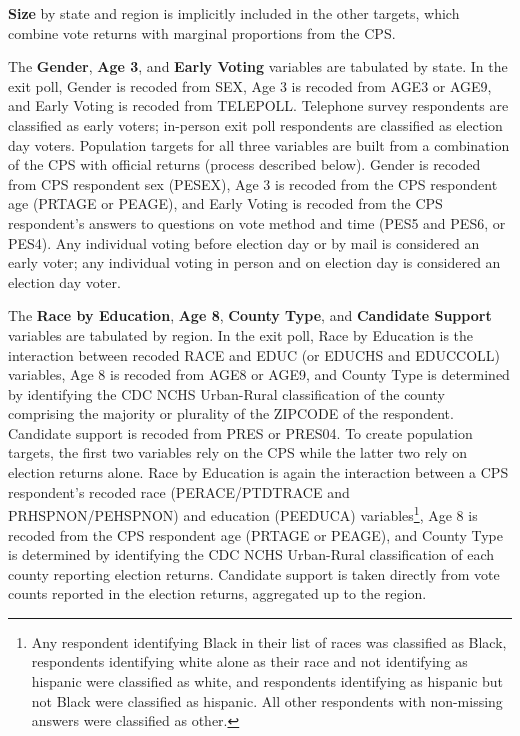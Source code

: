 \documentclass[12pt]{article}
\begin{document}
\textbf{Size} by state and region is implicitly included in the other targets, which combine vote returns with marginal proportions from the CPS.

The \textbf{Gender}, \textbf{Age 3}, and \textbf{Early Voting} variables are tabulated by state. In the exit poll, Gender is recoded from SEX, Age 3 is recoded from AGE3 or AGE9, and Early Voting is recoded from TELEPOLL. Telephone survey respondents are classified as early voters; in-person exit poll respondents are classified as election day voters. Population targets for all three variables are built from a combination of the CPS with official returns (process described below). Gender is recoded from CPS respondent sex (PESEX), Age 3 is recoded from the CPS respondent age (PRTAGE or PEAGE), and Early Voting is recoded from the CPS respondent's answers to questions on vote method and time (PES5 and PES6, or PES4). Any individual voting before election day or by mail is considered an early voter; any individual voting in person and on election day is considered an election day voter.

The \textbf{Race by Education}, \textbf{Age 8}, \textbf{County Type}, and \textbf{Candidate Support} variables are tabulated by region. In the exit poll, Race by Education is the interaction between recoded RACE and EDUC (or EDUCHS and EDUCCOLL) variables, Age 8 is recoded from AGE8 or AGE9, and County Type is determined by identifying the CDC NCHS Urban-Rural classification of the county comprising the majority or plurality of the ZIPCODE of the respondent. Candidate support is recoded from PRES or PRES04. To create population targets, the first two variables rely on the CPS while the latter two rely on election returns alone. Race by Education is again the interaction between a CPS respondent's recoded race (PERACE/PTDTRACE and PRHSPNON/PEHSPNON) and education (PEEDUCA) variables\footnote{Any respondent identifying Black in their list of races was classified as Black, respondents identifying white alone as their race and not identifying as hispanic were classified as white, and respondents identifying as hispanic but not Black were classified as hispanic. All other respondents with non-missing answers were classified as other.}, Age 8 is recoded from the CPS respondent age (PRTAGE or PEAGE), and County Type is determined by identifying the CDC NCHS Urban-Rural classification of each county reporting election returns. Candidate support is taken directly from vote counts reported in the election returns, aggregated up to the region.
\end{document}
